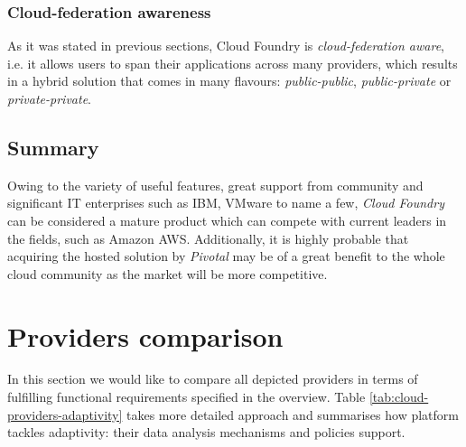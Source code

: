 \subsubsection{Cloud-federation awareness}
As it was stated in previous sections, Cloud Foundry is \emph{cloud-federation aware}, i.e. it allows users to span their applications across many providers, which results in a hybrid solution that comes in many flavours: \emph{public-public}, \emph{public-private} or \emph{private-private}.


\subsection{Summary}
Owing to the variety of useful features, great support from community and significant IT enterprises such as IBM, VMware to name a few, \emph{Cloud Foundry} can be considered a mature product which can compete with current leaders in the fields, such as Amazon AWS.
Additionally, it is highly probable that acquiring the hosted solution by \emph{Pivotal} may be of a great benefit to the whole cloud community as the market will be more competitive.

\section{Providers comparison}
In this section we would like to compare all depicted providers in terms of fulfilling functional requirements specified in the overview. Table \ref{tab:cloud-providers-adaptivity} takes more detailed approach and summarises how platform tackles adaptivity: their data analysis mechanisms and policies support.

